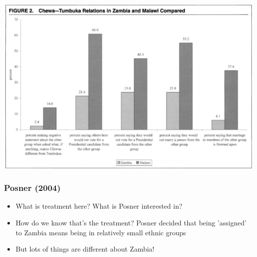 \documentclass[xcolor=x11names,compress]{beamer}\usepackage[]{graphicx}\usepackage[]{color}
\renewcommand{\(}{\begin{columns}}
\renewcommand{\)}{\end{columns}}
\newcommand{\<}[1]{\begin{column}{#1}}
\renewcommand{\>}{\end{column}}
\begin{document}
\includegraphics[width=1\textwidth]{Posner_results.png}

\begin{frame}
\frametitle{Posner (2004)}
\begin{itemize}
\item What is treatment here? \pause What is Posner interested in?
\pause
\item How do we know that's the treatment? Posner decided that being 'assigned' to Zambia means being in relatively small ethnic groups
\pause
\item But lots of things are different about Zambia!
\end{itemize}
\end{frame}
\end{document}
